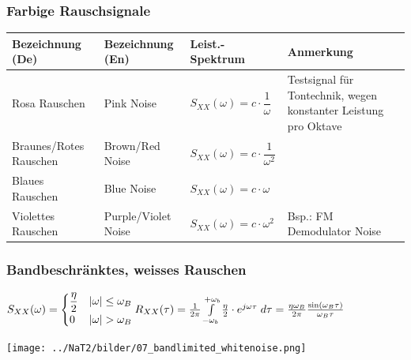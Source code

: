 \subsubsection{Farbige Rauschsignale}
\renewcommand{\arraystretch}{2}
\begin{tabular}[c]{ | p{4cm} | p{3.5cm} | p{3cm} | p{6cm} | }
	\hline
		\textbf{Bezeichnung (De)}
		& \textbf{Bezeichnung (En)}
		& \textbf{Leist.-Spektrum}
		& \textbf{Anmerkung} \\
	\hline
		Rosa Rauschen
		& Pink Noise
		& $S_{XX}(\omega) = c \cdot \dfrac{1}{\omega}$
		& Testsignal für Tontechnik, wegen konstanter Leistung pro Oktave \\
	\hline
		Braunes/Rotes Rauschen
		& Brown/Red Noise
		&	$S_{XX}(\omega) = c \cdot \dfrac{1}{\omega^2}$
		& \\
	\hline
		Blaues Rauschen
		& Blue Noise
		&	$S_{XX}(\omega) = c \cdot \omega$
		& \\
	\hline
		Violettes Rauschen
		& Purple/Violet Noise
		&	$S_{XX}(\omega) = c \cdot \omega^2$
		& Bsp.: FM Demodulator Noise\\
    \hline
\end{tabular}
\renewcommand{\arraystretch}{1}

\subsubsection{Bandbeschränktes, weisses Rauschen}
\begin{center}
	\begin{minipage}{8cm}
		$S_{XX}(\omega) = \begin{cases}
                      \dfrac{\eta}{2} & |\omega| \leq \omega_B \\
                      0 & |\omega| > \omega_B
                      \end{cases} \\ \\
		R_{XX}(\tau) =  \frac{1}{2\pi} \int\limits_{-\omega_{b}}^{+\omega_{b}}
                                           \frac{\eta}{2}  \cdot e^{j\omega\tau}\; d\tau
                      = \frac{\eta\omega_{B}}{2\pi} \frac{\sin(\omega_{B}\tau)}{\omega_{B}\tau}$
  	\end{minipage}
	\begin{minipage}{10cm}
		\texttt{[image: ../NaT2/bilder/07\_bandlimited\_whitenoise.png]}
  	\end{minipage}
\end{center}


